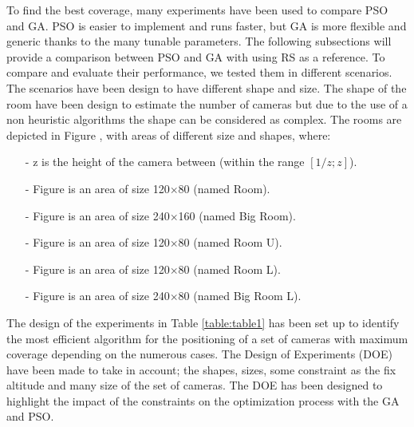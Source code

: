 To find the best coverage, many experiments have been used to compare PSO and GA. PSO is easier to implement and runs faster, but GA is more flexible and generic thanks to the many tunable parameters. 
The following subsections will provide a comparison between PSO and GA with using RS as a reference.%
To compare and evaluate their performance, we tested them in different scenarios. The scenarios have been  design to have different shape and size. The shape of the room have been design to estimate the number of cameras but due to the use of a non heuristic algorithms the shape can be considered as complex. The rooms are depicted in Figure , with areas of different size and shapes, where: 




\begin{itemize}
\item[-]    z is the height of the camera between (within the range $[1/z;z]$).
\item[-]	Figure  is an area of size 120$\times$80 (named Room). 
\item[-]	Figure  is an area of size 240$\times$160 (named Big Room).
\item[-]	Figure  is an area of size 120$\times$80 (named Room U).
\item[-]	Figure  is an area of size 120$\times$80 (named Room L).
\item[-]	Figure  is an area of size 240$\times$80 (named Big Room L).
\end{itemize}


The design of the experiments in Table \ref{table:table1} has been set up to identify the most efficient algorithm for the positioning of a set of cameras with maximum coverage depending on the numerous cases. 
The Design of Experiments (DOE) have been made to take in account; the  shapes, sizes, some constraint as the fix altitude and  many size of the set of cameras. The DOE has been designed to highlight the impact of the constraints on the optimization process with the GA and PSO.


